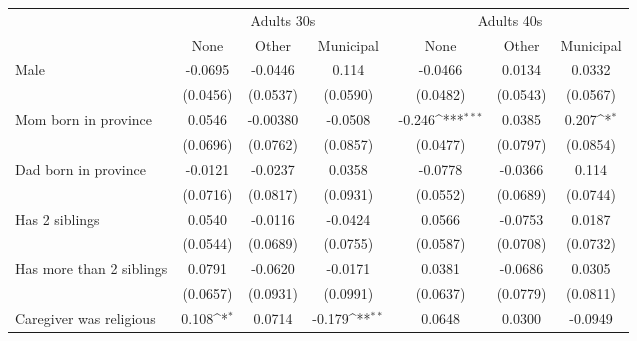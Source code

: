 {
\def\sym#1{\ifmmode^{#1}\else\(^{#1}\)\fi}
\begin{tabular}{l*{6}{c}}
\toprule
		& \multicolumn{3}{c}{Adults 30s} &  \multicolumn{3}{c}{Adults 40s} \\
                    &\multicolumn{1}{c}{None}&\multicolumn{1}{c}{Other}&\multicolumn{1}{c}{Municipal}&\multicolumn{1}{c}{None}&\multicolumn{1}{c}{Other}&\multicolumn{1}{c}{Municipal}\\
\midrule
Male                &     -0.0695         &     -0.0446         &       0.114         &     -0.0466         &      0.0134         &      0.0332         \\
                    &    (0.0456)         &    (0.0537)         &    (0.0590)         &    (0.0482)         &    (0.0543)         &    (0.0567)         \\
\addlinespace
Mom born in province&      0.0546         &    -0.00380         &     -0.0508         &      -0.246\sym{***}&      0.0385         &       0.207\sym{*}  \\
                    &    (0.0696)         &    (0.0762)         &    (0.0857)         &    (0.0477)         &    (0.0797)         &    (0.0854)         \\
\addlinespace
Dad born in province&     -0.0121         &     -0.0237         &      0.0358         &     -0.0778         &     -0.0366         &       0.114         \\
                    &    (0.0716)         &    (0.0817)         &    (0.0931)         &    (0.0552)         &    (0.0689)         &    (0.0744)         \\
\addlinespace
Has 2 siblings      &      0.0540         &     -0.0116         &     -0.0424         &      0.0566         &     -0.0753         &      0.0187         \\
                    &    (0.0544)         &    (0.0689)         &    (0.0755)         &    (0.0587)         &    (0.0708)         &    (0.0732)         \\
\addlinespace
Has more than 2 siblings&      0.0791         &     -0.0620         &     -0.0171         &      0.0381         &     -0.0686         &      0.0305         \\
                    &    (0.0657)         &    (0.0931)         &    (0.0991)         &    (0.0637)         &    (0.0779)         &    (0.0811)         \\
\addlinespace
Caregiver was religious&       0.108\sym{*}  &      0.0714         &      -0.179\sym{**} &      0.0648         &      0.0300         &     -0.0949         \\

\end{tabular}}
